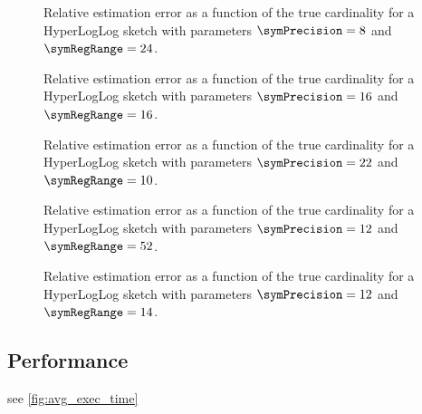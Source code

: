 \documentclass[a4paper]{scrartcl}
\begin{document}
\begin{figure}
\centering

\caption{Relative estimation error as a function of the true cardinality for a HyperLogLog sketch with parameters $\symPrecision = 8$ and $\symRegRange=24$.}
\label{fig:estimation_error_8_24}
\end{figure}

\begin{figure}
\centering

\caption{Relative estimation error as a function of the true cardinality for a HyperLogLog sketch with parameters $\symPrecision = 16$ and $\symRegRange=16$.}
\label{fig:estimation_error_16_16}
\end{figure}

\begin{figure}
\centering

\caption{Relative estimation error as a function of the true cardinality for a HyperLogLog sketch with parameters $\symPrecision = 22$ and $\symRegRange=10$.}
\label{fig:estimation_error_22_10}
\end{figure}

\begin{figure}
\centering

\caption{Relative estimation error as a function of the true cardinality for a HyperLogLog sketch with parameters $\symPrecision = 12$ and $\symRegRange=52$.}
\label{fig:estimation_error_12_52}
\end{figure}

\begin{figure}
\centering

\caption{Relative estimation error as a function of the true cardinality for a HyperLogLog sketch with parameters $\symPrecision = 12$ and $\symRegRange=14$.}
\label{fig:estimation_error_12_14}
\end{figure}

\subsection{Performance}
see \cref{fig:avg_exec_time}
\end{document}

